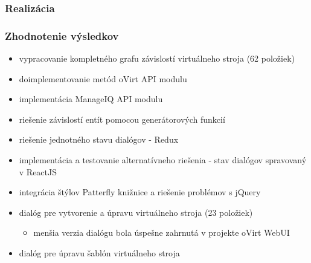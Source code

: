 \documentclass[pdf]{beamer}
\begin{document}
\begin{frame}
\frametitle{Realizácia}

\begin{figure}[h]
\label{labelledSelect}
\end{figure}

\begin{figure}[h]
\label{labelledSelect}
\end{figure} 

\begin{figure}[h]
\label{labelledSelect}
\end{figure} 


\begin{figure}[h]
\label{labelledSelect}
\end{figure}

\end{frame}

\begin{frame}
\frametitle{Zhodnotenie výsledkov}

\begin{itemize}
\item vypracovanie kompletného grafu závislostí virtuálneho stroja (62 položiek)
\item doimplementovanie metód oVirt API modulu
\item implementácia ManageIQ API modulu
\item riešenie závislostí entít pomocou generátorových funkcií
\item riešenie jednotného stavu dialógov - Redux
\item implementácia a testovanie alternatívneho riešenia - stav dialógov spravovaný v ReactJS
\item integrácia štýlov Patterfly knižnice a riešenie problémov s jQuery
\item dialóg pre vytvorenie a úpravu virtuálneho stroja (23 položiek)
\begin{itemize}
\item menšia verzia dialógu bola úspešne zahrnutá v projekte oVirt WebUI
\end{itemize}
\item dialóg pre úpravu šablón virtuálneho stroja
\end{itemize}

\end{frame}
\end{document}
